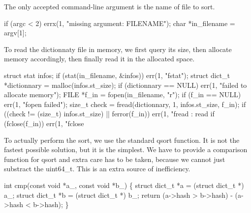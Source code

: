 \documentclass{article}%
\begin{document}
\nwendcode{}The only accepted command-line argument is the name of file to sort.

\nwenddocs{}\endmoddef\nwstartdeflinemarkup{}\nwenddeflinemarkup
if (argc < 2)
        errx(1, "missing argument: FILENAME");
char *in_filename = argv[1];

\nwendcode{}To read the dictionnaty file in memory, we first query its size, then
allocate memory accordingly, then finally read it in the allocated space.

\nwenddocs{}\endmoddef\nwstartdeflinemarkup{}\nwenddeflinemarkup
struct stat infos;
if (stat(in_filename, &infos))
        err(1, "fstat");
struct dict_t *dictionnary = malloc(infos.st_size);
if (dictionnary == NULL)
        err(1, "failed to allocate memory");
FILE *f_in = fopen(in_filename, "r");
if (f_in == NULL)
        err(1, "fopen failed");
size_t check = fread(dictionnary, 1, infos.st_size, f_in);
if ((check != (size_t) infos.st_size) || ferror(f_in))
        err(1, "fread : read %
if (fclose(f_in))
        err(1, "fclose %

\nwendcode{}To actually perform the sort, we use the standard {\Tt{}qsort\nwendquote} function. It is
not the fastest possible solution, but it is the simplest. We have to provide
a comparison function for {\Tt{}qsort\nwendquote} and extra care has to be taken, because we
cannot just substract the {\Tt{}uint64{\_}t\nwendquote}. This is an extra source of inefficiency.

\nwenddocs{}\endmoddef\nwstartdeflinemarkup{}\nwenddeflinemarkup
int cmp(const void *a_, const void *b_)
\{
        struct dict_t *a = (struct dict_t *) a_;
        struct dict_t *b = (struct dict_t *) b_;
        return (a->hash > b->hash) - (a->hash < b->hash);
\}
\end{document}
